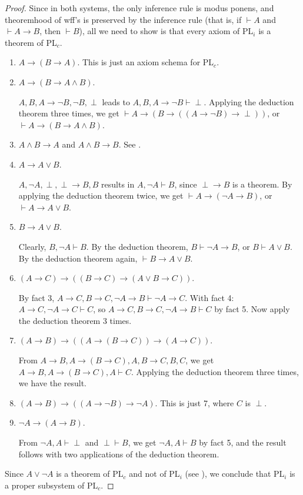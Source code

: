 \documentclass[12pt]{article}
\begin{document}
\begin{proof}  Since in both systems, the only inference rule is modus ponens, and theoremhood of wff's is preserved by the inference rule (that is, if $\vdash A$ and $\vdash A\to B$, then $\vdash B$), all we need to show is that every axiom of PL$_i$ is a theorem of PL$_c$.
\begin{enumerate}
\item $A \to (B \to A)$.  This is just an axiom schema for PL$_c$.
\item $A \to (B \to A \land B)$.

$A,B,A\to \neg B, \neg B, \perp$ leads to $A,B,A\to \neg B \vdash \perp$.  Applying the deduction theorem three times, we get $\vdash A\to (B\to ((A\to \neg B)\to \perp))$, or $\vdash A \to (B \to A\land B)$.
\item $A \land B \to A$ and $A \land B \to B$.  See .

\item $A \to A \lor B$.

$A,\neg A, \perp, \perp\to B, B$ results in $A,\neg A \vdash B$, since $\perp \to B$ is a theorem.  By applying the deduction theorem twice, we get $\vdash A \to (\neg A \to B)$, or $\vdash A\to A\lor B$.
\item $B \to A \lor B$.

Clearly, $B, \neg A \vdash B$.  By the deduction theorem, $B\vdash \neg A \to B$, or $B \vdash A \lor B$.  By the deduction theorem again, $\vdash B \to A\lor B$.
\item $(A \to C) \to ((B \to C) \to (A \lor B \to C))$.

By fact 3, $A\to C, B\to C, \neg A\to B \vdash \neg A \to C$.  With fact 4: $A\to C, \neg A \to C \vdash C$, so $A\to C, B\to C, \neg A\to B \vdash C$ by fact 5.  Now apply the deduction theorem 3 times.
\item $(A \to B) \to ((A \to (B \to C)) \to (A \to C))$.

From $A \to B, A\to (B\to C), A, B\to C, B, C$, we get $A\to B, A\to (B\to C), A \vdash C$.  Applying the deduction theorem three times, we have the result.
\item $(A \to B) \to ((A \to \neg B) \to \neg A)$.  This is just 7, where $C$ is $\perp$.
\item $\neg A \to  (A \to B)$.

From $\neg A, A\vdash \perp$ and $\perp \vdash B$, we get $\neg A,A\vdash B$ by fact 5, and the result follows with two applications of the deduction theorem.
\end{enumerate}
Since $A\lor \neg A$ is a theorem of PL$_c$ and not of PL$_i$ (see ), we conclude that PL$_i$ is a proper subsystem of PL$_c$.
\end{proof}
\end{document}
